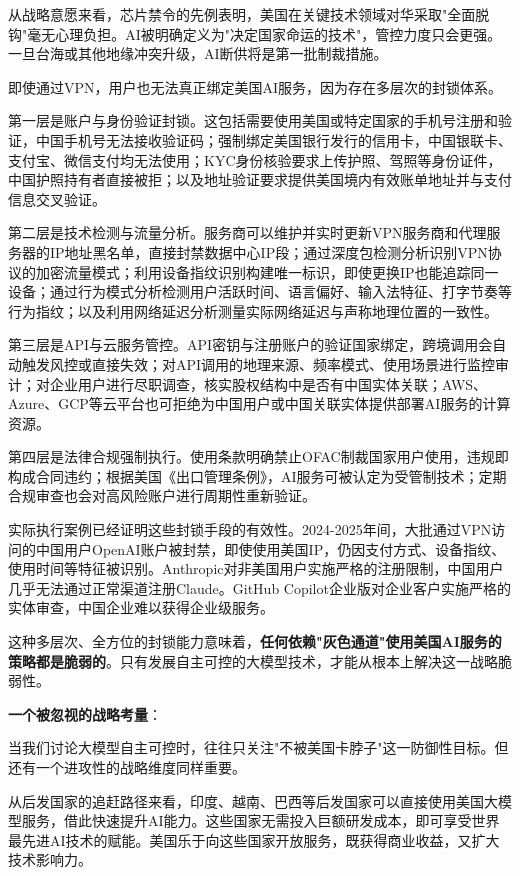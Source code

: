 从战略意愿来看，芯片禁令的先例表明，美国在关键技术领域对华采取"全面脱钩"毫无心理负担。AI被明确定义为"决定国家命运的技术"，管控力度只会更强。一旦台海或其他地缘冲突升级，AI断供将是第一批制裁措施。

即使通过VPN，用户也无法真正绑定美国AI服务，因为存在多层次的封锁体系。

第一层是账户与身份验证封锁。这包括需要使用美国或特定国家的手机号注册和验证，中国手机号无法接收验证码；强制绑定美国银行发行的信用卡，中国银联卡、支付宝、微信支付均无法使用；KYC身份核验要求上传护照、驾照等身份证件，中国护照持有者直接被拒；以及地址验证要求提供美国境内有效账单地址并与支付信息交叉验证。

第二层是技术检测与流量分析。服务商可以维护并实时更新VPN服务商和代理服务器的IP地址黑名单，直接封禁数据中心IP段；通过深度包检测分析识别VPN协议的加密流量模式；利用设备指纹识别构建唯一标识，即使更换IP也能追踪同一设备；通过行为模式分析检测用户活跃时间、语言偏好、输入法特征、打字节奏等行为指纹；以及利用网络延迟分析测量实际网络延迟与声称地理位置的一致性。

第三层是API与云服务管控。API密钥与注册账户的验证国家绑定，跨境调用会自动触发风控或直接失效；对API调用的地理来源、频率模式、使用场景进行监控审计；对企业用户进行尽职调查，核实股权结构中是否有中国实体关联；AWS、Azure、GCP等云平台也可拒绝为中国用户或中国关联实体提供部署AI服务的计算资源。

第四层是法律合规强制执行。使用条款明确禁止OFAC制裁国家用户使用，违规即构成合同违约；根据美国《出口管理条例》，AI服务可被认定为受管制技术；定期合规审查也会对高风险账户进行周期性重新验证。

实际执行案例已经证明这些封锁手段的有效性。2024-2025年间，大批通过VPN访问的中国用户OpenAI账户被封禁，即使使用美国IP，仍因支付方式、设备指纹、使用时间等特征被识别。Anthropic对非美国用户实施严格的注册限制，中国用户几乎无法通过正常渠道注册Claude。GitHub Copilot企业版对企业客户实施严格的实体审查，中国企业难以获得企业级服务。

这种多层次、全方位的封锁能力意味着，\textbf{任何依赖"灰色通道"使用美国AI服务的策略都是脆弱的}。只有发展自主可控的大模型技术，才能从根本上解决这一战略脆弱性。

\textbf{一个被忽视的战略考量}：

当我们讨论大模型自主可控时，往往只关注"不被美国卡脖子"这一防御性目标。但还有一个进攻性的战略维度同样重要。

从后发国家的追赶路径来看，印度、越南、巴西等后发国家可以直接使用美国大模型服务，借此快速提升AI能力。这些国家无需投入巨额研发成本，即可享受世界最先进AI技术的赋能。美国乐于向这些国家开放服务，既获得商业收益，又扩大技术影响力。

